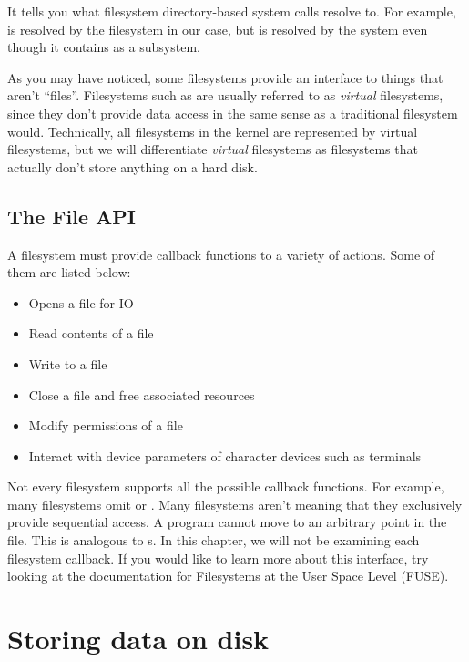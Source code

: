 It tells you what filesystem directory-based system calls resolve to.
For example, \keyword{/} is resolved by the  filesystem in our case, but  is resolved by the  system even though it contains \keyword{/} as a subsystem.

As you may have noticed, some filesystems provide an interface to things that aren't ``files''.
Filesystems such as  are usually referred to as \emph{virtual} filesystems, since they don't provide data access in the same sense as a traditional filesystem would.
Technically, all filesystems in the kernel are represented by virtual filesystems, but we will differentiate \emph{virtual} filesystems as filesystems that actually don't store anything on a hard disk.

\subsection{The File API}

A filesystem must provide callback functions to a variety of actions.
Some of them are listed below:

\begin{itemize}
  \item {} Opens a file for IO
  \item {} Read contents of a file
  \item {} Write to a file
  \item {} Close a file and free associated resources
  \item {} Modify permissions of a file
  \item {} Interact with device parameters of character devices such as terminals
\end{itemize}

Not every filesystem supports all the possible callback functions.
For example, many filesystems omit  or .
Many filesystems aren't  meaning that they exclusively provide sequential access.
A program cannot move to an arbitrary point in the file.
This is analogous to s.
In this chapter, we will not be examining each filesystem callback.
If you would like to learn more about this interface, try looking at the documentation for Filesystems at the User Space Level (FUSE).

\section{Storing data on disk}

